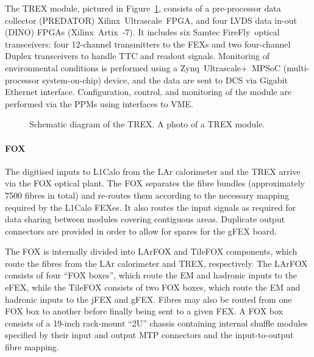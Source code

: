 \documentclass[cernpreprint, atlasdraft=false, UKenglish,british,orcidlogo, texmf, orcidlogo]{atlasdoc}
\begin{document}
The \gls{TREX} module, pictured in Figure~\ref{fig:TDAQL1CaloTREX}, consists of a pre-processor data collector (PREDATOR) Xilinx\textregistered~Ultrascale\texttrademark~\gls{FPGA}, and four \gls{LVDS} data in-out (DINO) \glspl{FPGA} (Xilinx\textregistered~Artix\textregistered~-7).  It includes six Samtec FireFly\texttrademark~optical transceivers: four 12-channel transmitters to the \glspl{FEX} and two four-channel Duplex transceivers to handle \gls{TTC} and readout signals.  Monitoring of environmental conditions is performed using a Zynq\textregistered~Ultrascale+\texttrademark~MPSoC (multi-processor system-on-chip) device, and the data are sent to \gls{DCS} via Gigabit Ethernet interface.  Configuration, control, and monitoring of the module are performed via the \glspl{PPM} using interfaces to \gls{VME}.
 
\begin{figure}[htbp]
\centering
{}
\caption{
\protect{} Schematic diagram of the \gls{TREX}.
\protect{} A photo of a \gls{TREX} module.
}
\label{fig:TDAQL1CaloTREX}
\end{figure}
 
\paragraph{FOX} 
The digitised inputs to \gls{L1Calo} from the \gls{LAr}  calorimeter and the \gls{TREX}  arrive via the \gls{FOX} optical plant.  The \gls{FOX}  separates the fibre bundles (approximately 7500 fibres in total) and re-routes them according to the necessary mapping required by the \gls{L1Calo} FEXes.  It also routes the input signals as required for data sharing between modules covering contiguous areas.  Duplicate output connectors are provided in order to allow for spares for the \gls{gFEX} board.
 
The \gls{FOX}  is internally divided into LArFOX and TileFOX components, which route the fibres from the \gls{LAr}  calorimeter and \gls{TREX}, respectively.  The LArFOX consists of four ``\gls{FOX}  boxes'', which route the \gls{EM} and hadronic inputs to the \gls{eFEX}, while the TileFOX consists of two \gls{FOX}  boxes, which route the \gls{EM} and hadronic inputs to the \gls{jFEX} and \gls{gFEX}.  Fibres may also be routed from one \gls{FOX}  box to another before finally being sent to a given \gls{FEX}.  A \gls{FOX}  box consists of a 19-inch rack-mount ``2U'' chassis containing internal shuffle modules specified by their input and output \gls{MTP} connectors and the input-to-output fibre mapping.
 
\end{document}
